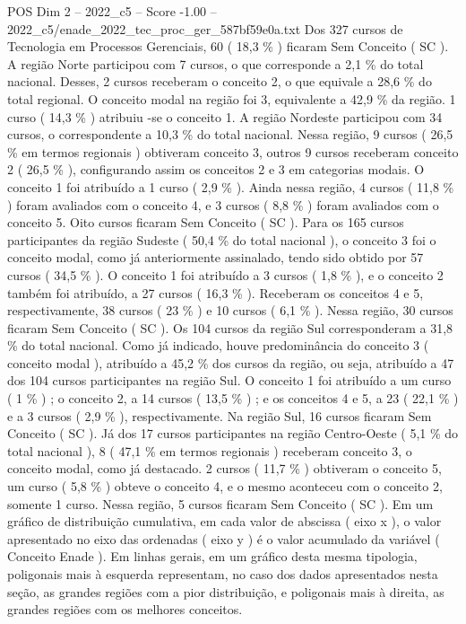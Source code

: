 \begin{textsample}{POS Dim 2 – 2022\_c5 – Score -1.00 – 2022\_c5/enade\_2022\_tec\_proc\_ger\_587bf59e0a.txt}
Dos 327 cursos de Tecnologia em Processos Gerenciais, 60 ( 18,3 \% ) ficaram Sem Conceito ( SC ).
A região Norte participou com 7 cursos, o que corresponde a 2,1 \% do total nacional.
Desses, 2 cursos receberam o conceito 2, o que equivale a 28,6 \% do total regional.
O conceito modal na região foi 3, equivalente a 42,9 \% da região. 1 curso ( 14,3 \% ) atribuiu -se o conceito 1.
A região Nordeste participou com 34 cursos, o correspondente a 10,3 \% do total nacional.
Nessa região, 9 cursos ( 26,5 \% em termos regionais ) obtiveram conceito 3, outros 9 cursos receberam conceito 2 ( 26,5 \% ), configurando assim os conceitos 2 e 3 em categorias modais.
O conceito 1 foi atribuído a 1 curso ( 2,9 \% ).
Ainda nessa região, 4 cursos ( 11,8 \% ) foram avaliados com o conceito 4, e 3 cursos ( 8,8 \% ) foram avaliados com o conceito 5.
Oito cursos ficaram Sem Conceito ( SC ).
Para os 165 cursos participantes da região Sudeste ( 50,4 \% do total nacional ), o conceito 3 foi o conceito modal, como já anteriormente assinalado, tendo sido obtido por 57 cursos ( 34,5 \% ).
O conceito 1 foi atribuído a 3 cursos ( 1,8 \% ), e o conceito 2 também foi atribuído, a 27 cursos ( 16,3 \% ).
Receberam os conceitos 4 e 5, respectivamente, 38 cursos ( 23 \% ) e 10 cursos ( 6,1 \% ).
Nessa região, 30 cursos ficaram Sem Conceito ( SC ).
Os 104 cursos da região Sul corresponderam a 31,8 \% do total nacional.
Como já indicado, houve predominância do conceito 3 ( conceito modal ), atribuído a 45,2 \% dos cursos da região, ou seja, atribuído a 47 dos 104 cursos participantes na região Sul.
O conceito 1 foi atribuído a um curso ( 1 \% ) ; o conceito 2, a 14 cursos ( 13,5 \% ) ; e os conceitos 4 e 5, a 23 ( 22,1 \% ) e a 3 cursos ( 2,9 \% ), respectivamente.
Na região Sul, 16 cursos ficaram Sem Conceito ( SC ).
Já dos 17 cursos participantes na região Centro-Oeste ( 5,1 \% do total nacional ), 8 ( 47,1 \% em termos regionais ) receberam conceito 3, o conceito modal, como já destacado. 2 cursos ( 11,7 \% ) obtiveram o conceito 5, um curso ( 5,8 \% ) obteve o conceito 4, e o mesmo aconteceu com o conceito 2, somente 1 curso.
Nessa região, 5 cursos ficaram Sem Conceito ( SC ).
Em um gráfico de distribuição cumulativa, em cada valor de abscissa ( eixo x ), o valor apresentado no eixo das ordenadas ( eixo y ) é o valor acumulado da variável ( Conceito Enade ).
Em linhas gerais, em um gráfico desta mesma tipologia, poligonais mais à esquerda representam, no caso dos dados apresentados nesta seção, as grandes regiões com a pior distribuição, e poligonais mais à direita, as grandes regiões com os melhores conceitos.

\end{textsample}
